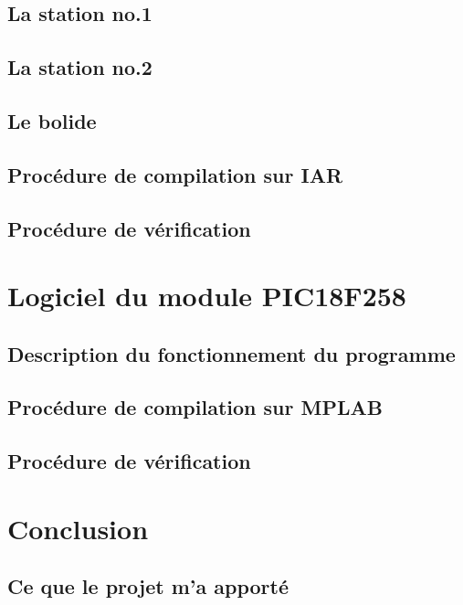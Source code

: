 \documentclass[10pt,a4paper,final]{article}
\begin{document}
\begin{spacing}{1.5}
\subsection{La station no.1}

\subsection{La station no.2}

\subsection{Le bolide}

\subsection{Procédure de compilation sur IAR}

\subsection{Procédure de vérification}




\section{Logiciel du module PIC18F258}
\subsection{Description du fonctionnement du programme}

\subsection{Procédure de compilation sur MPLAB}

\subsection{Procédure de vérification}






\pagebreak
\section{Conclusion}

\subsection{Ce que le projet m'a apporté}

\end{spacing}
\end{document}
